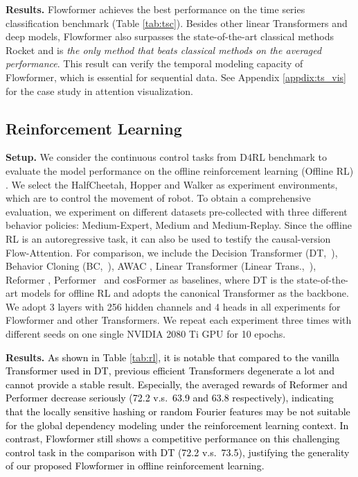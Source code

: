 \documentclass[nohyperref]{article}
\theoremstyle{plain}
\theoremstyle{definition}
\theoremstyle{remark}
\newcommand{\update}[1]{{\textcolor{black}{#1}}}
\begin{document}
\textbf{Results.} Flowformer achieves the best performance on the time series classification benchmark (Table \ref{tab:tsc}). Besides other linear Transformers and deep models, Flowformer also surpasses the state-of-the-art classical methods Rocket \cite{Dempster2020ROCKETEF} and is \emph{the only method that beats classical methods on the averaged performance}. This result can verify the temporal modeling capacity of Flowformer, which is essential for sequential data. See Appendix \ref{appdix:ts_vis} for the case study in attention visualization.


\subsection{Reinforcement Learning} 

\textbf{Setup.} We consider the continuous control tasks from D4RL benchmark \cite{Fu2020D4RLDF} to evaluate the model performance on the offline reinforcement learning (Offline RL) \cite{lange2012batch, levine2020offline}. We select the HalfCheetah, Hopper and Walker as experiment environments, which are to control the movement of robot. To obtain a comprehensive evaluation, we experiment on different datasets pre-collected with three different behavior policies: Medium-Expert, Medium and Medium-Replay. Since the offline RL is an autoregressive task, it can also be used to testify the causal-version Flow-Attention. For comparison, we include the Decision Transformer (DT,~\citealt{chen2021decision}), Behavior Cloning (BC,~\citealt{pomerleau1989alvinn}), AWAC \cite{nair2020awac}, Linear Transformer (Linear Trans.,~\cite{Katharopoulos2020TransformersAR}), Reformer \cite{kitaev2020reformer}, Performer~\cite{performer} and cosFormer \cite{anonymous2022cosformer} as baselines, where DT is the state-of-the-art models for offline RL and adopts the canonical Transformer as the backbone. We adopt 3 layers with 256 hidden channels and 4 heads in all experiments for Flowformer and other Transformers. We repeat each experiment three times with different seeds on one single NVIDIA 2080 Ti GPU for 10 epochs.

\textbf{Results.} 
\update{As shown in Table \ref{tab:rl}, it is notable that compared to the vanilla Transformer used in DT, previous efficient Transformers degenerate a lot and cannot provide a stable result. Especially, the averaged rewards of Reformer \cite{kitaev2020reformer} and Performer \cite{performer} decrease seriously (72.2 v.s.~63.9 and 63.8 respectively), indicating that the locally sensitive hashing or random Fourier features may be not suitable for the global dependency modeling under the reinforcement learning context. In contrast, Flowformer still shows a competitive performance on this challenging control task in the comparison with DT (72.2 v.s.~73.5), justifying the generality of our proposed Flowformer in offline reinforcement learning.}
\end{document}

